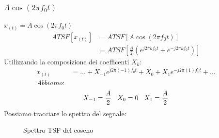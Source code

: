             \subsubsection{$A\cos(2\pi f_0 t)$}
                $x_{(t)}=A\cos(2\pi f_0 t)$
                \begin{align}
                    ATSF[x_{(t)}] & = ATSF[A\cos(2\pi f_0 t)] \nonumber \\
                        & = ATSF[\frac{A}{2} (e^{j2\pi kf_0t} + e^{-j2\pi kf_0t})] \nonumber 
                \end{align}
                Utilizzando la composizione dei coefficenti $X_k$:
                \begin{align}
                    x_{(t)} & =\ldots  + X_{-1} e^{j2\pi (-1)f_0t} + X_{0} + X_{1} e^{-j2\pi (1) f_0t} + \ldots \nonumber\\
                    Abbiamo:& \nonumber 
                \end{align}
                        \[X_{-1} = \frac{A}{2}\hspace{.3cm} X_{0} = 0\hspace{.3cm} X_{1} = \frac{A}{2}\] 
                Possiamo tracciare lo spettro del segnale:
                \begin{figure}[H]
                    \centering
                    \hfill
                    \caption{Spettro TSF del coseno}
                \end{figure}
